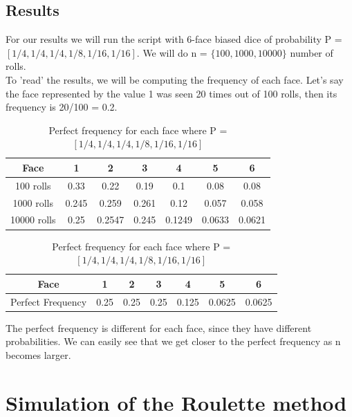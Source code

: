 \documentclass[a4paper]{article}
\begin{document}
\subsection*{Results}
For our results we will run the script with 6-face biased dice of probability P = $[ 1/4, 1/4, 1/4, 1/8, 1/16, 1/16]$. We will do n = $\{ 100, 1000, 10000\}$ number of rolls.\\
To 'read' the results, we will be computing the frequency of each face. Let's say the face represented by the value 1 was seen 20 times out of 100 rolls, then its frequency is 20/100 = 0.2.

\begin{table}[H]
\begin{center}
\begin{tabular}{|c|c|c|c|c|c|c|}
\hline
Face        & 1      & 2      & 3      & 4      & 5      & 6      \\ \hline
100 rolls   & 0.33   & 0.22   & 0.19    & 0.1   & 0.08   & 0.08   \\ \hline
1000 rolls  & 0.245  & 0.259  & 0.261  & 0.12  & 0.057  & 0.058  \\ \hline
10000 rolls & 0.25 & 0.2547 & 0.245 & 0.1249 & 0.0633 & 0.0621 \\ \hline
\end{tabular}
\caption*{\label{BD} Frequency of each face for different number of rolls}
\vspace{0.6cm}
\begin{tabular}{|c|c|c|c|c|c|c|}
\hline
Face              & 1    & 2    & 3    & 4     & 5      & 6      \\ \hline
Perfect Frequency & 0.25 & 0.25 & 0.25 & 0.125 & 0.0625 & 0.0625 \\ \hline
\end{tabular}
\caption*{\label{BD} Perfect frequency for each face where P = $[ 1/4, 1/4, 1/4, 1/8, 1/16, 1/16]$}
\end{center}
\end{table}
The perfect frequency is different for each face, since they have different probabilities. We can easily see that we get closer to the perfect frequency as n becomes larger.\\

\newpage
\section*{Simulation of the Roulette method}
\end{document}
